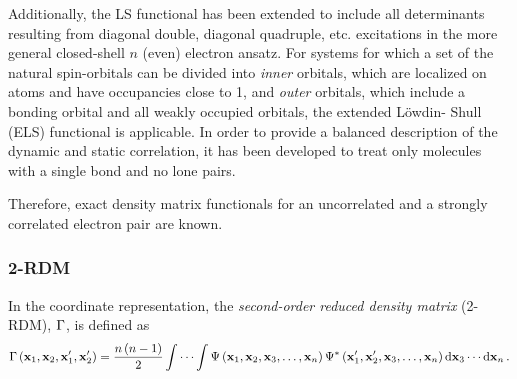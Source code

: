 \begin{enumerate}
        Additionally, the LS functional has been extended to include all 
        determinants resulting from diagonal double, diagonal quadruple, etc. 
        excitations in the more general closed-shell $n$ (even) electron ansatz.
        For systems for which a set of the natural spin-orbitals can be divided 
        into \textit{inner} orbitals, which are localized on atoms and have 
        occupancies close to 1, and \textit{outer} orbitals, which include a 
        bonding orbital and all weakly occupied orbitals, the extended Löwdin-
        Shull (ELS) functional is 
        applicable.
        In order to provide a balanced description of the dynamic and static 
        correlation, it has been developed to treat only molecules with a 
        single bond and no lone pairs.

\end{enumerate}

Therefore, exact density matrix functionals for an uncorrelated and a strongly
correlated electron pair are known.

\subsubsection{2-RDM} %
\label{sec:2-RDM}

In the coordinate representation, the \textit{second-order reduced density
matrix} (2-RDM), $\Gamma$, is defined as 
\begin{equation} \label{eq:sordm-coordinate-representation}
    \Gamma \left( \boldsymbol{\mathrm{x}}_1, \boldsymbol{\mathrm{x}}_2, \boldsymbol{\mathrm{x}}_1^{\prime}, \boldsymbol{\mathrm{x}}_2^{\prime} \right)
    =
    \frac{n\left( n - 1 \right)}{2} \idotsint
    \Psi \left( \boldsymbol{\mathrm{x}}_1, \boldsymbol{\mathrm{x}}_2, \boldsymbol{\mathrm{x}}_3, \ldots,  \boldsymbol{\mathrm{x}}_n \right)
    \Psi^{*} \left( \boldsymbol{\mathrm{x}}_1^{\prime}, \boldsymbol{\mathrm{x}}_2^{\prime}, \boldsymbol{\mathrm{x}}_3, \ldots,  \boldsymbol{\mathrm{x}}_n \right)
    \dd{ \boldsymbol{\mathrm{x}}_3} \cdots \dd{ \boldsymbol{\mathrm{x}}_n}
    .
\end{equation}

